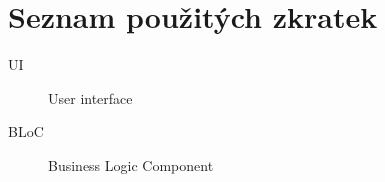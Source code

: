 \chapter{Seznam použitých zkratek}

\begin{description}
	\item[UI] User interface
	\item[BLoC] Business Logic Component 
\end{description}
